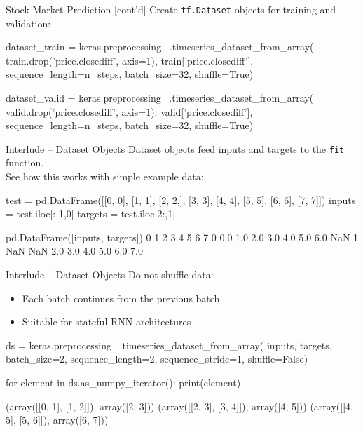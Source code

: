 \documentclass[ignorenonframetext,xcolor=x11names]{beamer}
\begin{document}
\begin{frame}[fragile]{Stock Market Prediction \small [cont'd]}
Create \texttt{tf.Dataset} objects for training and validation:
\begin{pythoncode}
dataset_train = keras.preprocessing \
    .timeseries_dataset_from_array(
        train.drop('price.closediff', axis=1),
        train['price.closediff'],
        sequence_length=n_steps,
        batch_size=32,
        shuffle=True)
\end{pythoncode}

\begin{pythoncode}
dataset_valid = keras.preprocessing \
    .timeseries_dataset_from_array(
        valid.drop('price.closediff', axis=1),
        valid['price.closediff'],
        sequence_length=n_steps,
        batch_size=32,
        shuffle=True)
\end{pythoncode}
\end{frame}

\begin{frame}[fragile]{Interlude -- Dataset Objects}
Dataset objects feed inputs and targets to the \texttt{fit} function. \\

See how this works with simple example data:
\begin{pythoncode}
test = pd.DataFrame([[0, 0], [1, 1], [2, 2,], [3, 3], 
                     [4, 4], [5, 5], [6, 6], [7, 7]]) 
inputs = test.iloc[:-1,0]
targets = test.iloc[2:,1]

pd.DataFrame([inputs, targets])
     0    1    2    3    4    5    6    7
0  0.0  1.0  2.0  3.0  4.0  5.0  6.0  NaN
1  NaN  NaN  2.0  3.0  4.0  5.0  6.0  7.0
\end{pythoncode}
\end{frame}

\begin{frame}[fragile]{Interlude -- Dataset Objects}
Do not shuffle data:
\begin{itemize}
    \item Each batch continues from the previous batch
    \item Suitable for stateful RNN architectures
\end{itemize}

\begin{pythoncode}
ds = keras.preprocessing \
    .timeseries_dataset_from_array(
        inputs, 
        targets,
        batch_size=2, 
        sequence_length=2,
        sequence_stride=1, 
        shuffle=False)
        
for element in ds.as_numpy_iterator():
     print(element)

(array([[0, 1],
       [1, 2]]), array([2, 3]))
(array([[2, 3],
       [3, 4]]), array([4, 5]))
(array([[4, 5],
       [5, 6]]), array([6, 7]))
\end{pythoncode}
\end{frame}
\end{document}
